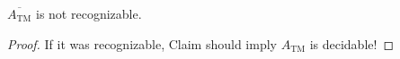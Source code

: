 \begin{corollary}
    $\overline{A_{\text{TM}}}$ is not recognizable.
\end{corollary}

\begin{proof}
    If it was recognizable, Claim should imply $A_{\text{TM}}$ is decidable!
\end{proof}

